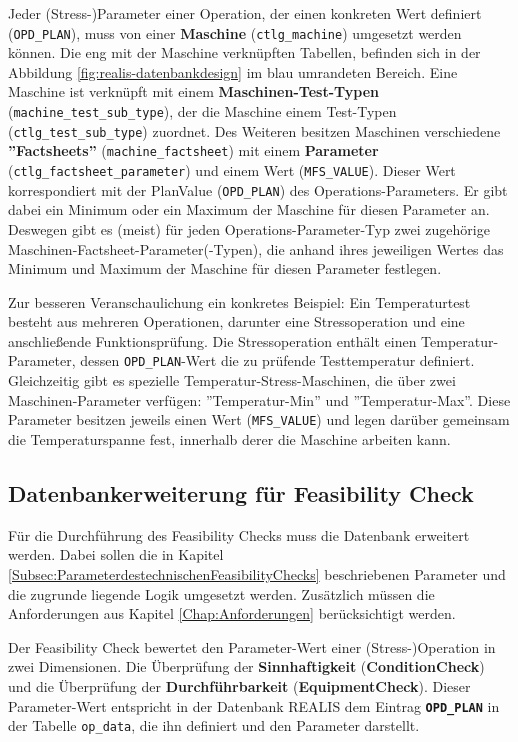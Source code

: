 Jeder (Stress-)Parameter einer Operation, der einen konkreten Wert definiert (\texttt{OPD\_\-PLAN}), muss von einer \textbf{Maschine} (\texttt{ctlg\_machine}) umgesetzt werden können. Die eng mit der Maschine verknüpften Tabellen, befinden sich in der Abbildung \ref{fig:realis-datenbankdesign} im blau umrandeten Bereich. Eine Maschine ist verknüpft mit einem \textbf{Maschinen-Test-Typen} (\texttt{machine\_test\_sub\_type}), der die Maschine einem Test-Typen (\texttt{ctlg\_\-test\_\-sub\_type}) zuordnet. Des Weiteren besitzen Maschinen verschiedene \textbf{''Fact\-sheets''} (\texttt{machine\_factsheet}) mit einem \textbf{Parameter} (\texttt{ctlg\_\-factsheet\_\-para\-meter}) und einem Wert (\texttt{MFS\_VALUE}). Dieser Wert korrespondiert mit der PlanValue (\texttt{OPD\_\-PLAN}) des Operations-Parameters. 
Er gibt dabei ein Minimum oder ein Maximum der Maschine für diesen Parameter an. Deswegen gibt es (meist) für jeden Operations-Parameter-Typ zwei zugehörige Maschinen-Factsheet-Parameter(-Typen), die anhand ihres jeweiligen Wertes das Minimum und Maximum der Maschine für diesen Parameter festlegen.

Zur besseren Veranschaulichung ein konkretes Beispiel: Ein Temperaturtest besteht aus mehreren Operationen, darunter eine Stressoperation und eine anschließende Funktionsprüfung. Die Stressoperation enthält einen Temperatur-Parameter, dessen \texttt{OPD\_PLAN}-Wert die zu prüfende Testtemperatur definiert. Gleichzeitig gibt es spezielle Temperatur-Stress-Maschinen, die über zwei Maschinen-Parameter verfügen: ''Temperatur-Min'' und ''Temperatur-Max''. Diese Parameter besitzen jeweils einen Wert (\texttt{MFS\_VALUE}) und legen darüber gemeinsam die Temperaturspanne fest, innerhalb derer die Maschine arbeiten kann.


\subsection{Datenbankerweiterung für Feasibility Check}

Für die Durchführung des Feasibility Checks muss die Datenbank erweitert werden. Dabei sollen die in Kapitel \ref{Subsec:ParameterdestechnischenFeasibilityChecks} beschriebenen Parameter und die zugrunde liegende Logik umgesetzt werden. Zusätzlich müssen die Anforderungen aus Kapitel \ref{Chap:Anforderungen} berücksichtigt werden.

Der Feasibility Check bewertet den Parameter-Wert einer (Stress-)Operation in zwei Dimensionen. Die Überprüfung der \textbf{Sinnhaftigkeit} (\textbf{\gls{ConditionCheck}}) und die Überprüfung der \textbf{Durchführbarkeit} (\textbf{\gls{EquipmentCheck}}).
Dieser Parameter-Wert entspricht in der Datenbank REALIS dem Eintrag \textbf{\texttt{OPD\_PLAN}} in der Tabelle \texttt{op\_data}, die ihn definiert und den Parameter darstellt.

